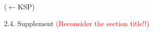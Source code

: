 \documentclass[a4paper,11pt]{book}
\begin{document}
($\leftarrow$KSP)
\pend
\medskip
\pstart
\mbox{}\hfill {}\hfill\mbox{}
\pend

\bigskip

\pstart\noindent
{\large 2.4. Supplement \textcolor{red}{(Reconsider the section title!!)}}
\pend

\bigskip
\end{document}
